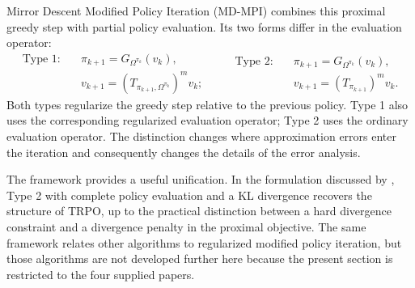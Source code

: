 Mirror Descent Modified Policy Iteration (MD-MPI) combines this proximal
greedy step with partial policy evaluation. Its two forms differ in the
evaluation operator:
\begin{equation}
    \begin{aligned}
        \text{Type 1:}\quad
        &\pi_{k+1}=G_{\Omega^{\pi_k}}(v_k),\\
        &v_{k+1}=(T_{\pi_{k+1},\Omega^{\pi_k}})^m v_k;
    \end{aligned}
    \qquad
    \begin{aligned}
        \text{Type 2:}\quad
        &\pi_{k+1}=G_{\Omega^{\pi_k}}(v_k),\\
        &v_{k+1}=(T_{\pi_{k+1}})^m v_k.
    \end{aligned}
    \label{eq:rl-mdmpi-types}
\end{equation}
Both types regularize the greedy step relative to the previous policy. Type 1
also uses the corresponding regularized evaluation operator; Type 2 uses the
ordinary evaluation operator. The distinction changes where approximation
errors enter the iteration and consequently changes the details of the error
analysis.

The framework provides a useful unification. In the formulation discussed by
\textcite{geist2019regularized}, Type 2 with complete policy evaluation and a
KL divergence recovers the structure of TRPO, up to the practical distinction
between a hard divergence constraint and a divergence penalty in the proximal
objective. The same framework relates other algorithms to regularized
modified policy iteration, but those algorithms are not developed further
here because the present section is restricted to the four supplied papers.


